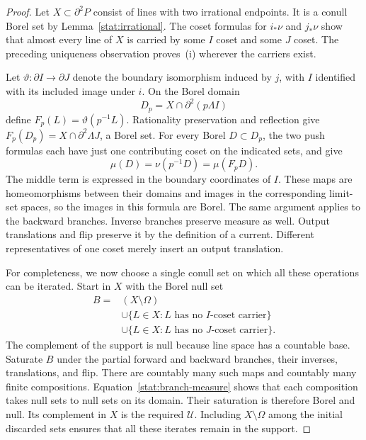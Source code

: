 \begin{proof}
Let $X\subset\partial^2P$ consist of lines with two irrational
endpoints.  It is a conull Borel set by Lemma~\ref{stat:irrational}.
The coset formulas for $i_*\nu$ and $j_*\nu$ show that almost every
line of $X$ is carried by some $I$ coset and some $J$ coset.
The preceding uniqueness observation proves~(i) wherever the
carriers exist.

Let $\vartheta:\partial I\to\partial J$ denote the boundary
isomorphism induced by $j$, with $I$ identified with its included
image under $i$.  On the Borel domain
\[
                   D_p=X\cap\partial^2(p\Lambda I)
\]
define $F_p(L)=\vartheta(p^{-1}L)$.  Rationality preservation and
reflection give $F_p(D_p)=X\cap\partial^2\Lambda J$, a Borel set.
For every Borel $D\subset D_p$, the
two push formulas each have just one contributing coset on the
indicated sets, and give
\begin{equation}\label{stat:branch-measure}
                    \mu(D)=\nu(p^{-1}D)=\mu(F_pD).
\end{equation}
The middle term is expressed in the boundary coordinates of $I$.
These maps are homeomorphisms between their domains and images in
the corresponding limit-set spaces, so the images in this formula
are Borel.  The same argument applies to the backward branches.
Inverse branches preserve measure as well.  Output translations and
flip preserve it by the definition of a current.  Different
representatives of one coset merely insert an output translation.

For completeness, we now choose a single conull set on which all
these operations can be iterated.  Start in $X$ with the Borel null
set
\[
 \begin{split}
 B={}&(X\setminus\Omega)\\
    &\cup\{L\in X:L\text{ has no }I\text{-coset carrier}\}\\
    &\cup\{L\in X:L\text{ has no }J\text{-coset carrier}\}.
 \end{split}
\]
The complement of the support is null because line space has a
countable base.  Saturate $B$ under the partial forward and backward
branches, their inverses, translations, and flip.  There are
countably many such maps and countably many finite compositions.
Equation~\eqref{stat:branch-measure} shows that each composition
takes null sets to null sets on its domain.  Their saturation is
therefore Borel and null.  Its complement in $X$ is the required
$\mathcal U$.  Including $X\setminus\Omega$ among the initial
discarded sets ensures that all these iterates remain in the
support.
\end{proof}

